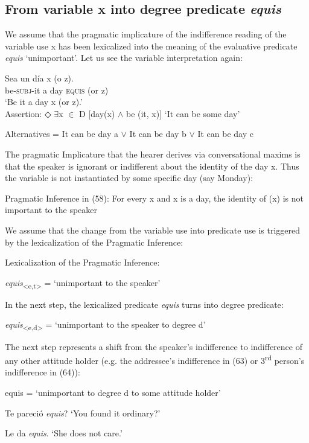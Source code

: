 \documentclass[output=paper]{langsci/langscibook}
\begin{document}
\subsection{From variable x into degree predicate \textit{equis}}\label{sec:kellert:4.1}
We assume that the pragmatic implicature of the indifference reading of the variable use x has been lexicalized into the meaning of the evaluative predicate \textit{equis} ‘unimportant’.  Let us see the variable interpretation again:

\ea
\gll Sea un día x (o z).\\
 be-\textsc{subj}-it a day \textsc{equis} (or z)\\
\glt ‘Be it a day x (or z).’\\
Assertion: ◇ $\exists$x $\in$ D {[}day(x) $\wedge$ be (it, x){]} ‘It can be some day’\par
Alternatives = It can be day a $\vee$ It can be day b $\vee$ It can be day c
\z

The pragmatic Implicature that the hearer derives via conversational maxims is that the speaker is ignorant or indifferent about the identity of the day x. Thus the variable is not instantiated by some specific day (say Monday):

\ea Pragmatic Inference in (58): For every x and x is a day, the identity of (x) is not important to the speaker
\z

We assume that the change from the variable use into predicate use is triggered by the lexicalization of the Pragmatic Inference:

\ea Lexicalization of the Pragmatic Inference:\par
	\textit{equis}\textsubscript{<e,t>} = ‘unimportant to the speaker’
\z

In the next step, the lexicalized predicate \textit{equis} turns into degree predicate:

\ea \textit{equis}\textsubscript{<e,d>} = ‘unimportant to the speaker to degree d’
\z

The next step represents a shift from the speaker’s indifference to  indifference of any other attitude holder (e.g. the addressee’s indifference in (63) or 3\textsuperscript{rd} person’s indifference in (64)):

\ea	equis = ‘unimportant to degree d to some attitude holder’
\z

\ea Te pareció \textit{equis}? ‘You found it ordinary?’
\z

\ea Le da \textit{equis}. ‘She does not care.’
\z
\end{document}
